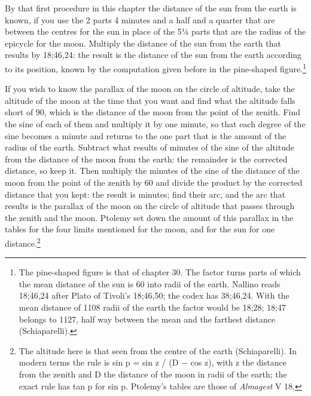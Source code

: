 \documentclass[11pt]{article}
\begin{document}
\par By that first procedure in this chapter the distance of the sun from the earth is known, if you use the 2 parts 4 minutes and a half and a quarter that are between the centres for the sun in place of the 5¼ parts that are the radius of the epicycle for the moon. Multiply the distance of the sun from the earth that results by 18;46,24: the result is the distance of the sun from the earth according to its position, known by the computation given before in the pine-shaped figure.\footnote{The pine-shaped figure is that of chapter 30. The factor turns parts of which the mean distance of the sun is 60 into radii of the earth. Nallino reads 18;46,24 after Plato of Tivoli's 18;46,50; the codex has 38;46,24. With the mean distance of 1108 radii of the earth the factor would be 18;28; 18;47 belongs to 1127, half way between the mean and the farthest distance (Schiaparelli).}\par
\par If you wish to know the parallax of the moon on the circle of altitude, take the altitude of the moon at the time that you want and find what the altitude falls short of 90, which is the distance of the moon from the point of the zenith. Find the sine of each of them and multiply it by one minute, so that each degree of the sine becomes a minute and returns to the one part that is the amount of the radius of the earth. Subtract what results of minutes of the sine of the altitude from the distance of the moon from the earth: the remainder is the corrected distance, so keep it. Then multiply the minutes of the sine of the distance of the moon from the point of the zenith by 60 and divide the product by the corrected distance that you kept: the result is minutes; find their arc, and the arc that results is the parallax of the moon on the circle of altitude that passes through the zenith and the moon. Ptolemy set down the amount of this parallax in the tables for the four limits mentioned for the moon, and for the sun for one distance.\footnote{The altitude here is that seen from the centre of the earth (Schiaparelli). In modern terms the rule is sin p = sin z / (D − cos z), with z the distance from the zenith and D the distance of the moon in radii of the earth; the exact rule has tan p for sin p. Ptolemy's tables are those of \emph{Almagest} V 18.}\par
\end{document}
